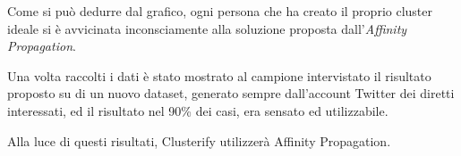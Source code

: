 Come si può dedurre dal grafico, ogni persona che ha creato il proprio cluster ideale si è avvicinata inconsciamente alla soluzione proposta dall'\emph{Affinity Propagation}. 

Una volta raccolti i dati è stato mostrato al campione intervistato il risultato proposto su di un nuovo dataset, generato sempre dall'account Twitter dei diretti interessati, ed il risultato nel 90\% dei casi, era sensato ed utilizzabile.

Alla luce di questi risultati, Clusterify utilizzerà Affinity Propagation.
